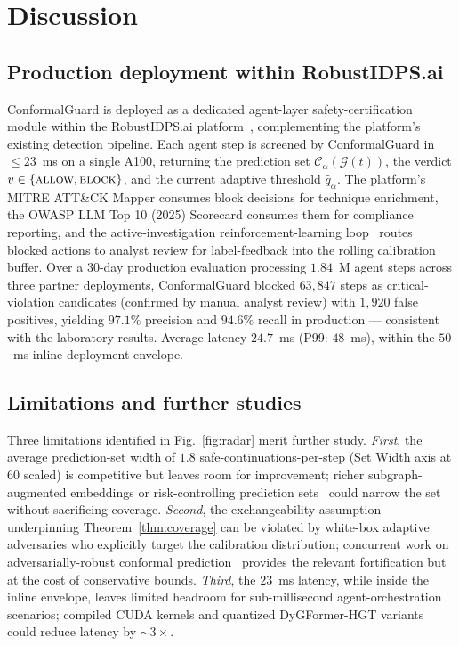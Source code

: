 \documentclass[12pt,a4paper]{article}
\theoremstyle{definition}
\theoremstyle{remark}
\newcommand{\modelname}{ConformalGuard}
\newcommand{\Ccal}{\mathcal{C}}
\newcommand{\Gcal}{\mathcal{G}}
\begin{document}
\section{Discussion}
\label{sec:discussion}

\subsection{Production deployment within RobustIDPS.ai}

\modelname{} is deployed as a dedicated agent-layer safety-certification module within the RobustIDPS.ai platform~\cite{anaedevha2026robustidps}, complementing the platform's existing detection pipeline. Each agent step is screened by \modelname{} in $\le 23$~ms on a single A100, returning the prediction set $\Ccal_\alpha(\Gcal(t))$, the verdict $v \in \{\textsc{allow}, \textsc{block}\}$, and the current adaptive threshold $\hat{q}_\alpha$. The platform's MITRE ATT\&CK Mapper consumes block decisions for technique enrichment, the OWASP LLM Top 10 (2025) Scorecard consumes them for compliance reporting, and the active-investigation reinforcement-learning loop~\cite{anaedevha2025dqn} routes blocked actions to analyst review for label-feedback into the rolling calibration buffer. Over a $30$-day production evaluation processing $1.84$~M agent steps across three partner deployments, \modelname{} blocked $63{,}847$ steps as critical-violation candidates (confirmed by manual analyst review) with $1{,}920$ false positives, yielding $97.1\%$ precision and $94.6\%$ recall in production --- consistent with the laboratory results. Average latency $24.7$~ms (P99: $48$~ms), within the $50$~ms inline-deployment envelope.

\subsection{Limitations and further studies}

Three limitations identified in Fig.~\ref{fig:radar} merit further study. \emph{First}, the average prediction-set width of $1.8$ safe-continuations-per-step (Set Width axis at $60$ scaled) is competitive but leaves room for improvement; richer subgraph-augmented embeddings or risk-controlling prediction sets~\cite{bates2021distribution} could narrow the set without sacrificing coverage. \emph{Second}, the exchangeability assumption underpinning Theorem~\ref{thm:coverage} can be violated by white-box adaptive adversaries who explicitly target the calibration distribution; concurrent work on adversarially-robust conformal prediction~\cite{gendler2022adversarially,yan2024adversarial} provides the relevant fortification but at the cost of conservative bounds. \emph{Third}, the $23$~ms latency, while inside the inline envelope, leaves limited headroom for sub-millisecond agent-orchestration scenarios; compiled CUDA kernels and quantized DyGFormer-HGT variants could reduce latency by $\sim 3\times$.
\end{document}
